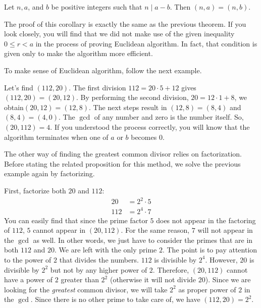 \documentclass{subfile}
\begin{document}
	\begin{corollary}
		Let $n, a$, and $b$ be positive integers such that $n\mid a-b$. Then $(n,a)=(n,b)$.
	\end{corollary}

	The proof of this corollary is exactly the same as the previous theorem. If you look closely, you will find that we did not make use of the given inequality $0 \leq r < a$ in the process of proving Euclidean algorithm. In fact, that condition is given only to make the algorithm more efficient.

	To make sense of Euclidean algorithm, follow the next example.
	\begin{example}
		Let's find $(112,20)$. The first division $112=20\cdot 5+12$ gives $(112,20)=(20,12)$. By performing the second division, $20=12\cdot1+8$, we obtain$(20,12)=(12,8)$. The next steps result in $(12,8)=(8,4)$ and $(8,4)=(4,0)$. The $\gcd$ of any number and zero is the number itself. So, $(20,112)=4$. If you understood the process correctly, you will know that the algorithm terminates when one of $a$ or $b$ becomes $0$.
	\end{example}

	The other way of finding the greatest common divisor relies on factorization. Before stating the related proposition for this method, we solve the previous example again by factorizing.

	\begin{example}
		First, factorize both $20$ and $112$:
		\begin{align*}
			20  &= 2^2\cdot5\\
			112 &= 2^4\cdot7
		\end{align*}
		You can easily find that since the prime factor $5$ does not appear in the factoring of $112$, $5$ cannot appear in $(20,112)$. For the same reason, $7$ will not appear in the $\gcd$ as well. In other words, we just have to consider the primes that are in both $112$ and $20$. We are left with the only prime $2$. The point is to pay attention to the power of $2$ that divides the numbers. $112$ is divisible by $2^4$. However, $20$ is divisible by $2^2$ but not by any higher power of $2$. Therefore, $(20, 112)$ cannot have a power of $2$ greater than $2^2$ (otherwise it will not divide $20$). Since we are looking for the \textit{greatest} common divisor, we will take $2^2$ as proper power of $2$ in the $\gcd$. Since there is no other prime to take care of, we have $(112,20)=2^2$.
	\end{example}
\end{document}

